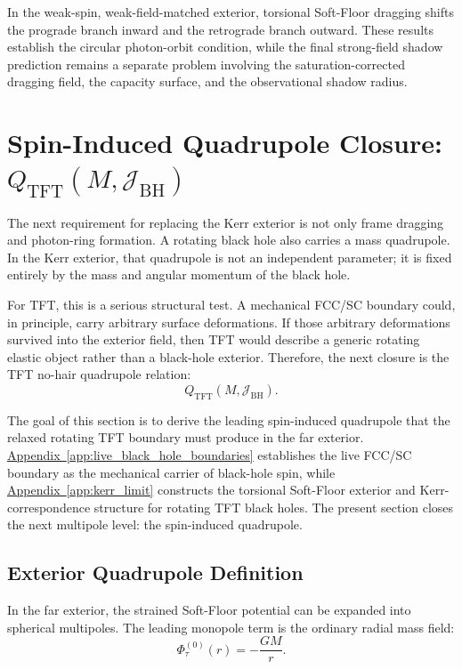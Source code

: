 In the weak-spin, weak-field-matched exterior, torsional Soft-Floor dragging shifts the prograde branch inward and the retrograde branch outward. These results establish the circular photon-orbit condition, while the final strong-field shadow prediction remains a separate problem involving the saturation-corrected dragging field, the capacity surface, and the observational shadow radius.

\section{Spin-Induced Quadrupole Closure: $Q_{\mathrm{TFT}}(M,\mathcal{J}_{\mathrm{BH}})$}

The next requirement for replacing the Kerr exterior is not only frame dragging and photon-ring formation. A rotating black hole also carries a mass quadrupole. In the Kerr exterior, that quadrupole is not an independent parameter; it is fixed entirely by the mass and angular momentum of the black hole.

For TFT, this is a serious structural test. A mechanical FCC/SC boundary could, in principle, carry arbitrary surface deformations. If those arbitrary deformations survived into the exterior field, then TFT would describe a generic rotating elastic object rather than a black-hole exterior. Therefore, the next closure is the TFT no-hair quadrupole relation:
\begin{equation}
    Q_{\mathrm{TFT}}(M,\mathcal{J}_{\mathrm{BH}}).
\end{equation}

The goal of this section is to derive the leading spin-induced quadrupole that the relaxed rotating TFT boundary must produce in the far exterior. \hyperref[app:live_black_hole_boundaries]{Appendix~\ref*{app:live_black_hole_boundaries}} establishes the live FCC/SC boundary as the mechanical carrier of black-hole spin, while \hyperref[app:kerr_limit]{Appendix~\ref*{app:kerr_limit}} constructs the torsional Soft-Floor exterior and Kerr-correspondence structure for rotating TFT black holes. The present section closes the next multipole level: the spin-induced quadrupole. 

\subsection{Exterior Quadrupole Definition}

In the far exterior, the strained Soft-Floor potential can be expanded into spherical multipoles. The leading monopole term is the ordinary radial mass field:
\begin{equation}
    \Phi_{\tau}^{(0)}(r) = -\frac{GM}{r}.
\end{equation}

